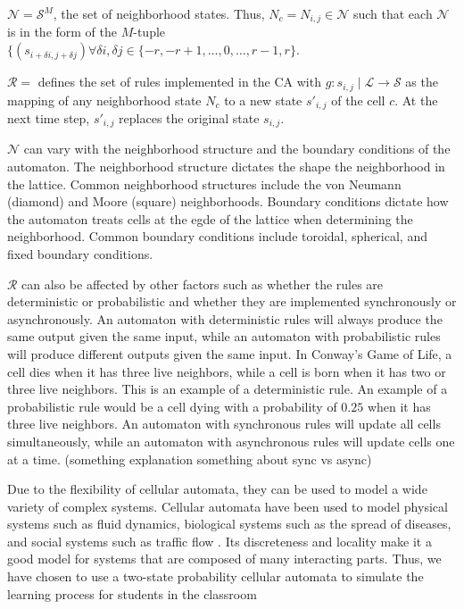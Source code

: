 $\mathcal{N} = \mathcal{S}^M$, the set of neighborhood states. Thus, $N_c = N_{i,j} \in \mathcal{N}$ such that each $\mathcal{N}$ is in the form of the $M$-tuple $\lbrace (s_{i+\delta i, j+\delta j}) \forall \delta i, \delta j \in \lbrace -r, -r+1, \dots, 0, \dots, r-1, r \rbrace$.

$\mathcal{R} =$ defines the set of rules implemented in the CA with $g : s_{i,j} \mid \mathcal{L} \rightarrow \mathcal{S}$ as the mapping of any neighborhood state $N_c$ to a new state $s'_{i,j}$ of the cell $c$. At the next time step, $s'_{i,j}$ replaces the original state $s_{i,j}$.

$\mathcal{N}$ can vary with the neighborhood structure and the boundary conditions of the automaton. The neighborhood structure dictates the shape the neighborhood in the lattice. Common neighborhood structures include the von Neumann (diamond) and Moore (square) neighborhoods. Boundary conditions dictate how the automaton treats cells at the egde of the lattice when determining the neighborhood. Common boundary conditions include toroidal, spherical, and fixed boundary conditions. 

$\mathcal{R}$ can also be affected by other factors such as whether the rules are deterministic or probabilistic and whether they are implemented synchronously or asynchronously. An automaton with deterministic rules will always produce the same output given the same input, while an automaton with probabilistic rules will produce different outputs given the same input. In Conway's Game of Life, a cell dies when it has three live neighbors, while a cell is born when it has two or three live neighbors. This is an example of a deterministic rule. An example of a probabilistic rule would be a cell dying with a probability of $0.25$ when it has three live neighbors. An automaton with synchronous rules will update all cells simultaneously, while an automaton with asynchronous rules will update cells one at a time. (something explanation something about sync vs async)


Due to the flexibility of cellular automata, they can be used to model a wide variety of complex systems. Cellular automata have been used to model physical systems such as fluid dynamics, biological systems such as the spread of diseases, and social systems such as traffic flow \cite{louis2018probabilistic}. Its discreteness and locality make it a good model for systems that are composed of many interacting parts. Thus, we have chosen to use a two-state probability cellular automata to simulate the learning process for students in the classroom


